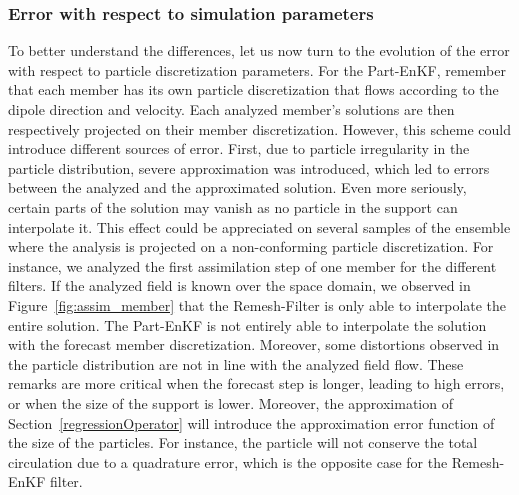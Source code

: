 \subsubsection{Error with respect to simulation parameters}

To better understand the differences, let us now turn to the evolution of the error with respect to particle discretization parameters. For the Part-EnKF, remember that each member has its own particle discretization that flows according to the dipole direction and velocity. Each analyzed member's solutions are then respectively projected on their member discretization. However, this scheme could introduce different sources of error. First, due to particle irregularity in the particle distribution, severe approximation was introduced, which led to errors between the analyzed and the approximated solution. Even more seriously, certain parts of the solution may vanish as no particle in the support can interpolate it. This effect could be appreciated on several samples of the ensemble where the analysis is projected on a non-conforming particle discretization. For instance, we analyzed the first assimilation step of one member for the different filters. If the analyzed field is known over the space domain, we observed in Figure~\ref{fig:assim_member} that the Remesh-Filter is only able to interpolate the entire solution. The Part-EnKF is not entirely able to interpolate the solution with the forecast member discretization.
Moreover, some distortions observed in the particle distribution are not in line with the analyzed field flow. These remarks are more critical when the forecast step is longer, leading to high errors, or when the size of the support is lower. Moreover, the approximation of Section~\ref{regressionOperator} will introduce the approximation error function of the size of the particles. For instance, the particle will not conserve the total circulation due to a quadrature error, which is the opposite case for the Remesh-EnKF filter.

